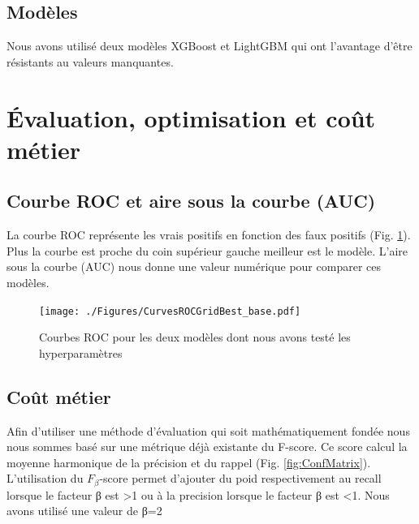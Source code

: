\documentclass[12pt, a4paper]{article}
\begin{document}
\subsection{Modèles}

Nous avons utilisé deux modèles XGBoost et LightGBM qui ont l'avantage d'être résistants au valeurs manquantes.

\section{Évaluation, optimisation et coût métier}

\subsection{Courbe ROC et aire sous la courbe (AUC)}

La courbe ROC représente les vrais positifs en fonction des faux positifs (Fig. \ref{fig:ROCCurves}).
Plus la courbe est proche du coin supérieur gauche meilleur est le modèle.
L'aire sous la courbe (AUC) nous donne une valeur numérique pour comparer ces modèles.

\begin{figure}[h]
    \begin{center}
        \texttt{[image: ./Figures/CurvesROCGridBest\_base.pdf]}
    \end{center}
    \caption{Courbes ROC pour les deux modèles dont nous avons testé les hyperparamètres}
    \label{fig:ROCCurves}
\end{figure}

\newpage
\subsection{Coût métier}

Afin d'utiliser une méthode d'évaluation qui soit mathématiquement fondée nous nous sommes basé sur une métrique déjà existante du F-score.
Ce score calcul la moyenne harmonique de la précision et du rappel (Fig. \ref{fig:ConfMatrix}).
L'utilisation du $F_β$-score permet d'ajouter du poid respectivement au recall lorsque le facteur β est \num{>1} ou à la precision lorsque le facteur β est \num{<1}.
Nous avons utilisé une valeur de β=2
\end{document}
